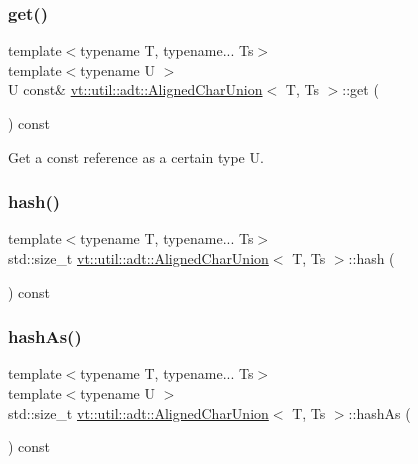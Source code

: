 \subsubsection{\texorpdfstring{get()}{get()}\hspace{0.1cm}{\footnotesize\ttfamily [2/2]}}
{\footnotesize\ttfamily template$<$typename T, typename... Ts$>$ \\
template$<$typename U $>$ \\
U const\& \hyperlink{structvt_1_1util_1_1adt_1_1_aligned_char_union}{vt\+::util\+::adt\+::\+Aligned\+Char\+Union}$<$ T, Ts $>$\+::get (\begin{DoxyParamCaption}{ }\end{DoxyParamCaption}) const\hspace{0.3cm}{\ttfamily [inline]}}



Get a const reference as a certain type {\ttfamily U}. 

\mbox{\label{structvt_1_1util_1_1adt_1_1_aligned_char_union_a5cdce588713b9d1e65b0be90bbeaa771}} 
\subsubsection{\texorpdfstring{hash()}{hash()}}
{\footnotesize\ttfamily template$<$typename T, typename... Ts$>$ \\
std\+::size\+\_\+t \hyperlink{structvt_1_1util_1_1adt_1_1_aligned_char_union}{vt\+::util\+::adt\+::\+Aligned\+Char\+Union}$<$ T, Ts $>$\+::hash (\begin{DoxyParamCaption}{ }\end{DoxyParamCaption}) const\hspace{0.3cm}{\ttfamily [inline]}}

\mbox{\label{structvt_1_1util_1_1adt_1_1_aligned_char_union_a7c7bfb6979d827a602e4aba1f6886cb8}} 
\subsubsection{\texorpdfstring{hash\+As()}{hashAs()}}
{\footnotesize\ttfamily template$<$typename T, typename... Ts$>$ \\
template$<$typename U $>$ \\
std\+::size\+\_\+t \hyperlink{structvt_1_1util_1_1adt_1_1_aligned_char_union}{vt\+::util\+::adt\+::\+Aligned\+Char\+Union}$<$ T, Ts $>$\+::hash\+As (\begin{DoxyParamCaption}{ }\end{DoxyParamCaption}) const\hspace{0.3cm}{\ttfamily [inline]}}

